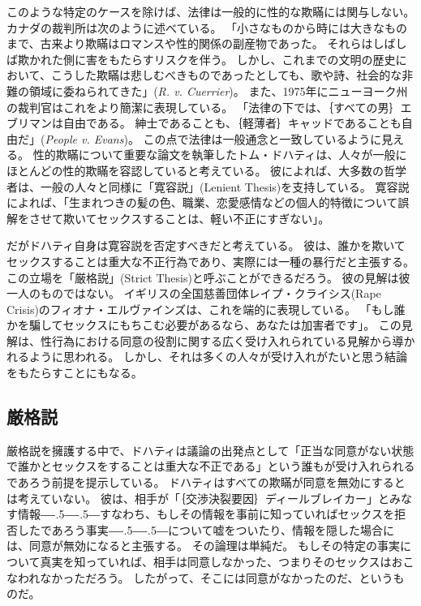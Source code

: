 \documentclass[paper=a4,book,openany]{jlreq}
\def\DDASH{―\kern-.5\zw―\kern-.5\zw―} %
\begin{document}
このような特定のケースを除けば、法律は一般的に性的な欺瞞には関与しない。
カナダの裁判所は次のように述べている。
「小さなものから時には大きなものまで、古来より欺瞞はロマンスや性的関係の副産物であった。
それらはしばしば欺かれた側に害をもたらすリスクを伴う。
しかし、これまでの文明の歴史において、こうした欺瞞は悲しむべきものであったとしても、歌や詩、社会的な非難の領域に委ねられてきた」(\emph{R. v. Cuerrier})。
また、1975年にニューヨーク州の裁判官はこれをより簡潔に表現している。
「法律の下では、｛すべての男｝{エブリマン}は自由である。
紳士であることも、｛軽薄者｝{キャッド}であることも自由だ」(\emph{People v. Evans})。
この点で法律は一般通念と一致しているように見える。
性的欺瞞について重要な論文を執筆したトム・ドハティは、人々が一般にほとんどの性的欺瞞を容認していると考えている。
彼によれば、大多数の哲学者は、一般の人々と同様に「寛容説」(Lenient Thesis)を支持している。
寛容説によれば、「生まれつきの髪の色、職業、恋愛感情などの個人的特徴について誤解をさせて欺いてセックスすることは、軽い不正にすぎない」\citep[p.718]{dougherty13:_sex_lies_consen}。

だがドハティ自身は寛容説を否定すべきだと考えている。
彼は、誰かを欺いてセックスすることは重大な不正行為であり、実際には一種の暴行だと主張する。
この立場を「厳格説」(Strict Thesis)と呼ぶことができるだろう。
彼の見解は彼一人のものではない。
イギリスの全国慈善団体レイプ・クライシス(Rape Crisis)のフィオナ・エルヴァインズは、これを端的に表現している。
「もし誰かを騙してセックスにもちこむ必要があるなら、あなたは加害者です」\citep{sanghani14:_lied_your_way_sex}。
この見解は、性行為における同意の役割に関する広く受け入れられている見解から導かれるように思われる。
しかし、それは多くの人々が受け入れがたいと思う結論をもたらすことにもなる。

\subsection{厳格説}

厳格説を擁護する中で、ドハティは議論の出発点として「正当な同意がない状態で誰かとセックスをすることは重大な不正である」という誰もが受け入れられるであろう前提を提示している\citep[p.722]{dougherty13:_sex_lies_consen}。
ドハティはすべての欺瞞が同意を無効にするとは考えていない。
彼は、相手が「｛交渉決裂要因｝{ディールブレイカー}」とみなす情報{\DDASH}すなわち、もしその情報を事前に知っていればセックスを拒否したであろう事実{\DDASH}について嘘をついたり、情報を隠した場合には、同意が無効になると主張する。
その論理は単純だ。
もしその特定の事実について真実を知っていれば、相手は同意しなかった、つまりそのセックスはおこなわれなかっただろう。
したがって、そこには同意がなかったのだ、というものだ。
\end{document}
